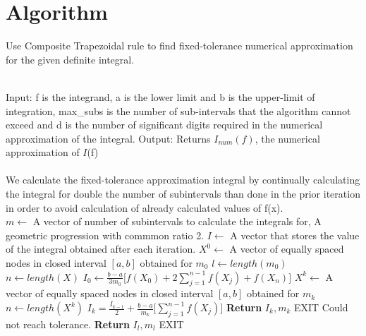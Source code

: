 \documentclass[12pt]{article}
\begin{document}
\section{Algorithm}
\begin{algorithm}[H]
	\caption{Use Composite Trapezoidal rule to find fixed-tolerance numerical approximation for the given definite integral.}
	\begin{algorithmic}
		\hline \\
		\State Input: f is the integrand, a is the lower limit and b is the upper-limit of integration, max\_subs is the number of sub-intervals that the algorithm cannot exceed and d is the number of significant digits required in the numerical approximation of the integral.
		\State Output: Returns $I_{num}(f)$, the numerical approximation of $I$(f) 
		\\
		\hline 
		\\
		\Comment We calculate the fixed-tolerance approximation integral by continually calculating the integral for double the number of subintervals than done in the prior iteration in order to avoid calculation of already calculated values of f(x). \\
		\State $m \gets$ A vector of number of subintervals to calculate the integrals for, A geometric progression with commmon ratio 2.
		\State $I \gets $  A vector that stores the value of the integral obtained after each iteration.
		\State $X^0 \gets $ A vector of equally spaced nodes in closed interval $[a,b]$ obtained for $m_0$
		\State $ l \gets length(m_0)$
		\State $ n \gets length(X)$
		\State $I_0 \gets {\displaystyle {\frac{b-a}{3m_0} }{\bigg [}f(X_{0})+2\sum _{j=1}^{n-1}f(X_{j})+f(X_{n}){\bigg ]}} $
		\State $X^k \gets $ A vector of equally spaced nodes in closed interval $[a,b]$ obtained for $m_k$
		\State $ n \gets length(X^k)$
		\State ${\displaystyle I_k = \frac{I_{k-1}}{2} + \frac{b-a}{m_k}{\bigg [}\sum _{j=1}^{n-1}f(X_{j}){\bigg ]}} $
		\State \textbf{Return} $I_k,m_k$
		\State EXIT
		\EndIf
		\EndFor    
		\State Could not reach tolerance.
		\State \textbf{Return} $I_l,m_l$
		\State EXIT
		\EndProcedure
	\end{algorithmic} 
\end{algorithm}

\newpage
\end{document}
